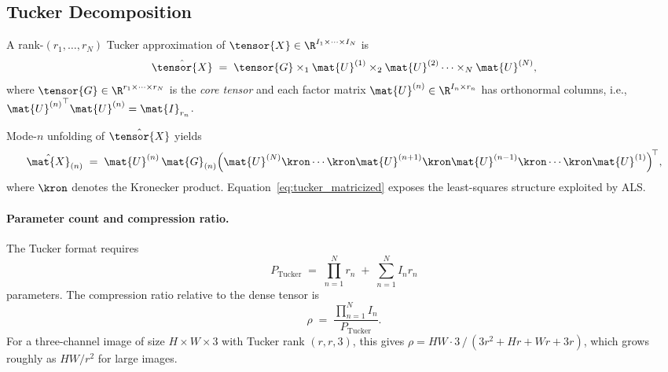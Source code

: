 \subsection{Tucker Decomposition}
\label{subsec:tucker}

\begin{definition}
  A rank-$(r_1, \ldots, r_N)$ Tucker approximation of
  $\tensor{X} \in \R^{I_1 \times \cdots \times I_N}$ is
  \begin{equation}
    \hat{\tensor{X}}
    \;=\; \tensor{G}
          \times_1 \mat{U}^{(1)}
          \times_2 \mat{U}^{(2)}
          \cdots
          \times_N \mat{U}^{(N)},
    \label{eq:tucker}
  \end{equation}
  where $\tensor{G} \in \R^{r_1 \times \cdots \times r_N}$ is the
  \emph{core tensor} and each factor matrix
  $\mat{U}^{(n)} \in \R^{I_n \times r_n}$ has orthonormal columns,
  i.e., ${\mat{U}^{(n)}}^\top \mat{U}^{(n)} = \mat{I}_{r_n}$.
\end{definition}

Mode-$n$ unfolding of $\hat{\tensor{X}}$ yields
\begin{equation}
  \hat{\mat{X}}_{(n)}
  \;=\; \mat{U}^{(n)}\, \mat{G}_{(n)}
        \Bigl(\mat{U}^{(N)} \kron \cdots \kron \mat{U}^{(n+1)}
              \kron \mat{U}^{(n-1)} \kron \cdots \kron \mat{U}^{(1)}
        \Bigr)^{\!\top},
  \label{eq:tucker_matricized}
\end{equation}
where $\kron$ denotes the Kronecker product.
Equation~\eqref{eq:tucker_matricized} exposes the least-squares structure
exploited by ALS.

\paragraph{Parameter count and compression ratio.}
The Tucker format requires
\begin{equation}
  P_{\mathrm{Tucker}}
  \;=\; \prod_{n=1}^{N} r_n
        \;+\; \sum_{n=1}^{N} I_n r_n
  \label{eq:tucker_params}
\end{equation}
parameters.
The compression ratio relative to the dense tensor is
\begin{equation}
  \rho
  \;=\; \frac{\displaystyle\prod_{n=1}^{N} I_n}
             {P_{\mathrm{Tucker}}}.
  \label{eq:tucker_ratio}
\end{equation}
For a three-channel image of size $H \times W \times 3$ with Tucker rank
$(r, r, 3)$, this gives
$\rho = HW \cdot 3\,/\,(3r^2 + Hr + Wr + 3r)$,
which grows roughly as $HW/r^2$ for large images.


